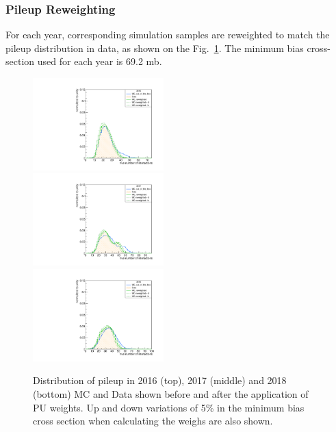 \subsubsection{Pileup Reweighting}
For each year, corresponding simulation samples are reweighted to match the pileup distribution in data, as shown on the Fig.~\ref{fig:puWeight2018}. The minimum bias cross-section used for each year is 69.2 mb.
\begin{figure}[!htb]
	\vspace*{0.3cm}
	\begin{center}
		\includegraphics[width=0.45\textwidth]{Figures/PileUp/pu_weights_2016.pdf} \\
                \includegraphics[width=0.45\textwidth]{Figures/PileUp/pu_weights_2017.pdf} \\
                \includegraphics[width=0.45\textwidth]{Figures/PileUp/pu_weights_2018.pdf} \\
		\caption{Distribution of pileup in 2016 (top), 2017 (middle) and 2018 (bottom) MC and Data shown before and after the application of PU weights. Up and down variations of 5\% in the minimum bias
			cross section when calculating the weighs are also shown.
			\label{fig:puWeight2018}}
	\end{center}
\end{figure}
